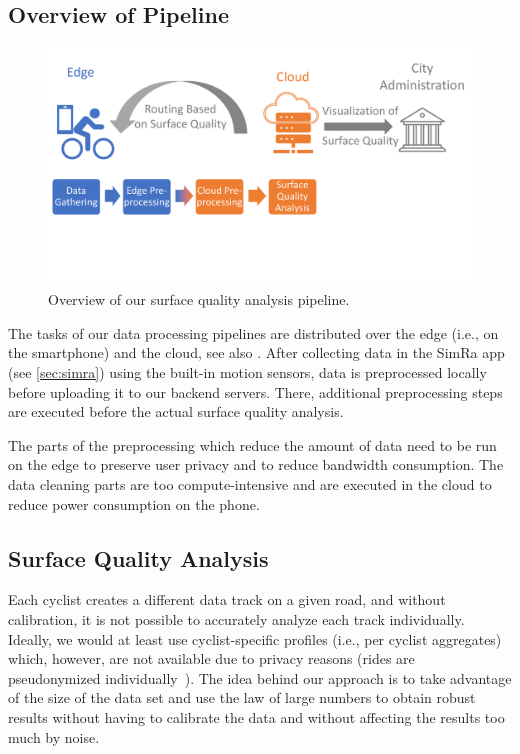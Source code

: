 \subsection{Overview of Pipeline}
\label{subsec:overview_of_pipeline}
\begin{figure}
    \centering
    \includegraphics[width=\columnwidth]{fig/overview.pdf}
    \caption{%
        Overview of our surface quality analysis pipeline.
    }%
    \label{fig:overview}
\end{figure}
The tasks of our data processing pipelines are distributed over the edge (i.e., on the smartphone) and the cloud, see also .
After collecting data in the SimRa app (see \ref{sec:simra}) using the built-in motion sensors, data is preprocessed locally before uploading it to our backend servers.
There, additional preprocessing steps are executed before the actual surface quality analysis.

The parts of the preprocessing which reduce the amount of data need to be run on the edge to preserve user privacy and to reduce bandwidth consumption.
The data cleaning parts are too compute-intensive and are executed in the cloud to reduce power consumption on the phone.

\subsection{Surface Quality Analysis}
\label{subsec:surface_quality_analysis}
Each cyclist creates a different data track on a given road, and without calibration, it is not possible to accurately analyze each track individually.
Ideally, we would at least use cyclist-specific profiles (i.e., per cyclist aggregates) which, however, are not available due to privacy reasons (rides are pseudonymized individually~\cite{karakaya2020simra}).
The idea behind our approach is to take advantage of the size of the data set and use the law of large numbers to obtain robust results without having to calibrate the data and without affecting the results too much by noise.

